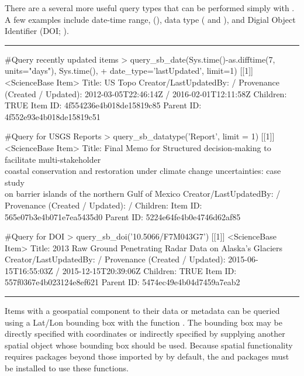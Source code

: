 There are a several more useful query types that can be performed simply with . 
A few examples include date-time range, (), data type 
( and ), and Digial Object Identifier (DOI; ). 

\noindent\rule{\textwidth}{0.4pt}
\begin{example}
#Query recently updated items
> query_sb_date(Sys.time()-as.difftime(7, units="days"), Sys.time(),
+    date_type='lastUpdated', limit=1)
[[1]]
<ScienceBase Item>
  Title: US Topo
  Creator/LastUpdatedBy:      /
  Provenance (Created / Updated):  2012-03-05T22:46:14Z / 2016-02-01T12:11:58Z
  Children: TRUE
  Item ID: 4f554236e4b018de15819c85
  Parent ID: 4f552e93e4b018de15819c51


#Query for USGS Reports
> query_sb_datatype('Report', limit = 1)
[[1]]
<ScienceBase Item> 
  Title: Final Memo for Structured decision-making to facilitate multi-stakeholder \\
  coastal conservation and restoration under climate change uncertainties: case study \\
  on barrier islands of the northern Gulf of Mexico
  Creator/LastUpdatedBy:      / 
  Provenance (Created / Updated):   / 
  Children: 
  Item ID: 565e07b3e4b071e7ea5435d0
  Parent ID: 5224e64fe4b0e4746d62af85
  
#Query for DOI
> query_sb_doi('10.5066/F7M043G7')
[[1]]
<ScienceBase Item>
  Title: 2013 Raw Ground Penetrating Radar Data on Alaska's Glaciers
  Creator/LastUpdatedBy:      /
  Provenance (Created / Updated):  2015-06-15T16:55:03Z / 2015-12-15T20:39:06Z
  Children: TRUE
  Item ID: 557f0367e4b023124e8ef621
  Parent ID: 5474ec49e4b04d7459a7eab2
\end{example}
\noindent\rule{\textwidth}{0.4pt}


Items with a geospatial component to their data or metadata can be queried using a
Lat/Lon bounding box with the function . The
bounding box may be directly specified with coordinates or indirectly specified
by supplying another spatial object whose bounding box should be used. Because
spatial functionality requires packages beyond those imported by  by default,
the  and  packages must be installed to use these functions.

